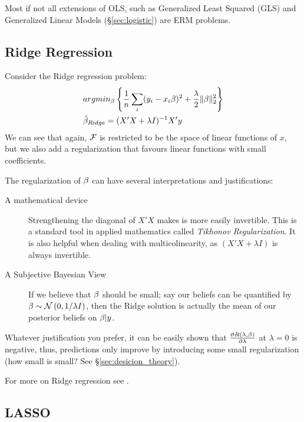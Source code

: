 \begin{remark}
Most if not all extensions of OLS, such as Generalized Least Squared (GLS) and Generalized Linear Models (\S\ref{sec:logistic}) are ERM problems. 
\end{remark}




\subsection{Ridge Regression}
\label{sec:ridge}

Consider the Ridge regression problem:
\begin{align}
\label{eq:ridge}
	& argmin_{\beta}\left\{ \frac{1}{n}\sum_i (y_i-x_i\beta)^2 + \frac{\lambda}{2}\Vert \beta \Vert_2^2 \right\} \\
	& \hat{\beta}_{Ridge}= (X'X+\lambda I)^{-1} X'y
\end{align}
We can see that again, $\mathcal{F}$ is restricted to be the space of linear functions of $x$, but we also add a regularization that favours linear functions with small coefficients.

The regularization of $\beta$ can have several interpretations and justifications:
\begin{description}
\item[A mathematical device] Strengthening the diagonal of $X'X$ makes is more easily invertible. This is a standard tool in applied mathematics called \emph{Tikhonov Regularization}. It is also helpful when dealing with multicolinearity, as $(X'X+\lambda I)$ is always invertible.
\item[A Subjective Bayesian View] If we believe that $\beta$ should be small; say our beliefs can be quantified by $\mathbf{\beta} \sim \mathcal{N}\left(0,1/\lambda I\right)$, then the Ridge solution is actually the mean of our posterior beliefs on $\mathbf{\beta}|y$.
\end{description}

Whatever justification you prefer, it can be easily shown that $\frac{\partial R(\lambda,\beta)}{\partial \lambda}$ at $\lambda=0$ is negative, thus, predictions only improve by introducing some small regularization (how small is small? See \S\ref{sec:desicion_theory}).

For more on Ridge regression see \cite{hastie_elements_2003}.


\subsection{LASSO}
\label{sec:lasso}

